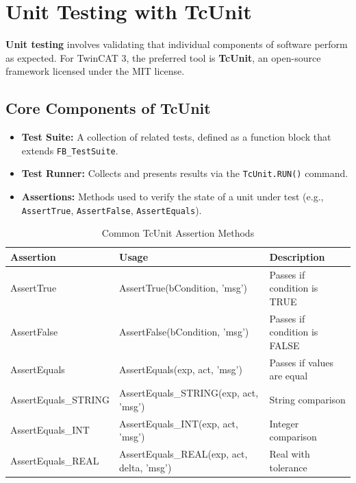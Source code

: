 \documentclass[11pt,a4paper]{article}
\begin{document}
\section{Unit Testing with TcUnit}

\textbf{Unit testing} involves validating that individual components of software perform as expected. For TwinCAT 3, the preferred tool is \textbf{TcUnit}, an open-source framework licensed under the MIT license.

\subsection{Core Components of TcUnit}

\begin{itemize}[leftmargin=*]
    \item \textbf{Test Suite:} A collection of related tests, defined as a function block that extends \texttt{FB\_TestSuite}.
    \item \textbf{Test Runner:} Collects and presents results via the \texttt{TcUnit.RUN()} command.
    \item \textbf{Assertions:} Methods used to verify the state of a unit under test (e.g., \texttt{AssertTrue}, \texttt{AssertFalse}, \texttt{AssertEquals}).
\end{itemize}

\begin{table}[h]
\centering
\begin{tabular}{@{}llp{5cm}@{}}
\toprule
\textbf{Assertion} & \textbf{Usage} & \textbf{Description} \\
\midrule
AssertTrue & AssertTrue(bCondition, 'msg') & Passes if condition is TRUE \\
AssertFalse & AssertFalse(bCondition, 'msg') & Passes if condition is FALSE \\
AssertEquals & AssertEquals(exp, act, 'msg') & Passes if values are equal \\
AssertEquals\_STRING & AssertEquals\_STRING(exp, act, 'msg') & String comparison \\
AssertEquals\_INT & AssertEquals\_INT(exp, act, 'msg') & Integer comparison \\
AssertEquals\_REAL & AssertEquals\_REAL(exp, act, delta, 'msg') & Real with tolerance \\
\bottomrule
\end{tabular}
\caption{Common TcUnit Assertion Methods}
\end{table}
\end{document}
